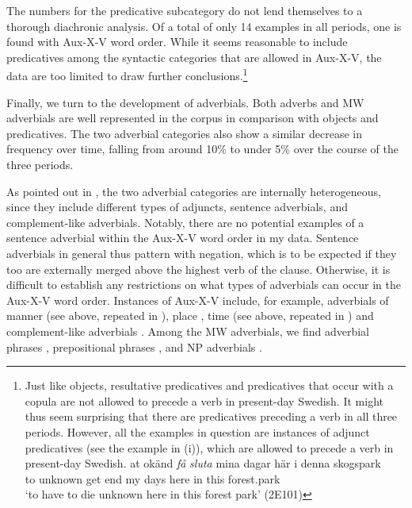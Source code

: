 \documentclass[output=paper, colorlinks, citecolor=brown]{langscibook}
\begin{document}
The numbers for the predicative subcategory do not lend themselves to a thorough diachronic analysis. Of a total of only 14 examples in all periods, one is found with Aux-X-V word order. While it seems reasonable to include predicatives among the syntactic categories that are allowed in Aux-X-V, the data are too limited to draw further conclusions.\footnote{Just like objects, resultative predicatives and predicatives that occur with a copula are not allowed to precede a verb in present-day Swedish. It might thus seem surprising that there are predicatives preceding a verb in all three periods. However, all the examples in question are instances of adjunct predicatives (see the example in (i)), which are allowed to precede a verb in present-day Swedish.  
\ea \gll at okänd \textit{få} \textit{sluta} mina  dagar  här  i  denna  skogspark\\
         to unknown  get  end  my  days  here  in  this  forest.park\\
     \glt ‘to have to die unknown here in this forest park’ (2E101)
\z}



Finally, we turn to the development of adverbials. Both adverbs and MW adverbials are well represented in the corpus in comparison with objects and predicatives. The two adverbial categories also show a similar decrease in frequency over time, falling from around 10\% to under 5\% over the course of the three periods.\largerpage[3]



As pointed out in , the two adverbial categories are internally heterogeneous, since they include different types of adjuncts, sentence adverbials, and complement-like adverbials. Notably, there are no potential examples of a sentence adverbial within the Aux-X-V word order in my data. Sentence adverbials in general thus pattern with negation, which is to be expected if they too are externally merged above the highest verb of the clause. Otherwise, it is difficult to establish any restrictions on what types of adverbials can occur in the Aux-X-V word order. Instances of Aux-X-V include, for example, adverbials of manner (see  above, repeated in ), place , time (see  above, repeated in ) and complement-like adverbials . Among the MW adverbials, we find adverbial phrases , prepositional phrases , and NP adverbials .
\end{document}
